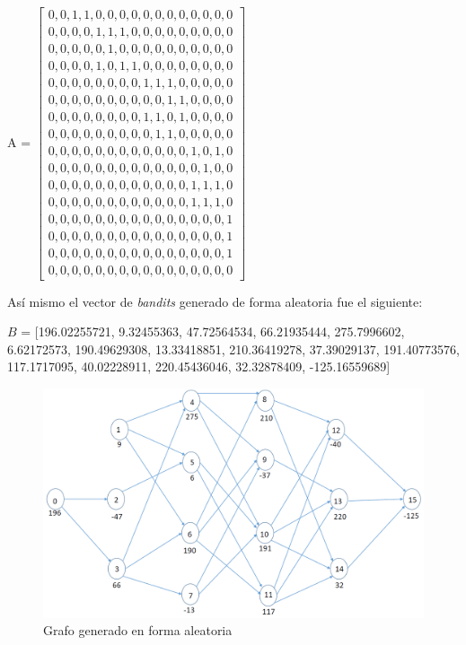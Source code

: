 \renewcommand{\arraystretch}{0.5}
A = 
$\begin{bmatrix}

0, 0, 1, 1,  0,  0,  0,  0,  0,  0,  0, 0, 0, 0, 0, 0\\
0, 0, 0, 0,  1,  1,  1,  0,  0,  0,  0, 0, 0, 0, 0, 0\\
0, 0, 0, 0,  0,  1,  0,  0,  0,  0,  0, 0, 0, 0, 0, 0\\
0, 0, 0, 0,  1,  0,  1,  1,  0,  0,  0, 0, 0, 0, 0, 0\\
0, 0, 0, 0,  0,  0,  0,  0,  1,  1,  1, 0, 0, 0, 0, 0\\
0, 0, 0, 0,  0,  0,  0,  0,  0,  0,  1, 1, 0, 0, 0, 0\\
0, 0, 0, 0,  0,  0,  0,  0,  1,  1,  0, 1, 0, 0, 0, 0\\
0, 0, 0, 0,  0,  0,  0,  0,  0,  1,  1, 0, 0, 0, 0, 0\\
0, 0, 0, 0,  0,  0,  0,  0,  0,  0,  0, 0, 1, 0, 1, 0\\
0, 0, 0, 0,  0,  0,  0,  0,  0,  0,  0, 0, 0, 1, 0, 0\\
0, 0, 0, 0,  0,  0,  0,  0,  0,  0,  0, 0, 1, 1, 1, 0\\
0, 0, 0, 0,  0,  0,  0,  0,  0,  0,  0, 0, 1, 1, 1, 0\\
0, 0, 0, 0,  0,  0,  0,  0,  0,  0,  0, 0, 0, 0, 0, 1\\
0, 0, 0, 0,  0,  0,  0,  0,  0,  0,  0, 0, 0, 0, 0, 1\\
0, 0, 0, 0,  0,  0,  0,  0,  0,  0,  0, 0, 0, 0, 0, 1\\
0, 0, 0, 0,  0,  0,  0,  0,  0,  0,  0, 0, 0, 0, 0, 0
\end{bmatrix}$

Así mismo el vector de \textit{bandits} generado de forma aleatoria fue el siguiente:

$B$ = [196.02255721, 9.32455363, 47.72564534, 66.21935444, 275.7996602, 6.62172573, 190.49629308, 13.33418851, 210.36419278, 37.39029137, 191.40773576, 117.1717095, 40.02228911, 220.45436046, 32.32878409, -125.16559689]

\begin{figure}[h]
	\centering
	\includegraphics[scale=0.4]{GrafoRandom.png}
	\caption{Grafo generado en forma aleatoria}
	\label{graforandom}
\end{figure}

